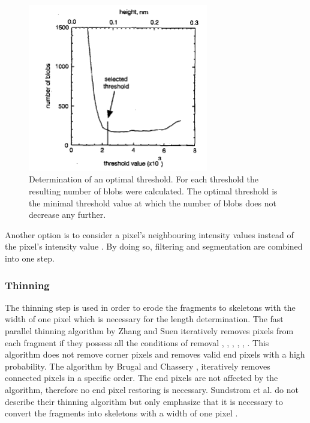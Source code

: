 \documentclass{article}
\begin{document}
\begin{figure}[htb]
\begin{center}
\includegraphics[width = 0.7\textwidth]{Segmentation_histo}
\end{center}
\caption{Determination of an optimal threshold. For each threshold the resulting number of blobs were calculated. The optimal threshold is the minimal threshold value at which the number of blobs does not decrease any further. \cite{russ1992image}}
\label{fig: blobs} %
\end{figure}

Another option is to consider a pixel’s neighbouring intensity values instead of the pixel’s intensity value  \cite{marek2005interactive}. By doing so, filtering and segmentation are combined into one step.


\subsubsection{Thinning}
The thinning step is used in order to erode the fragments to skeletons with the width of one pixel which is necessary for the length determination. The fast parallel thinning algorithm by Zhang and Suen iteratively removes pixels from each fragment if they possess all the conditions of removal  \cite{ficarra2005automated},  \cite{ficarra2002automated},  \cite{ficarra2005automatic},  \cite{spisz1998automated},  \cite{zhang1984fast},  \cite{marturelliautomated}. This algorithm does not remove corner pixels and removes valid end pixels with a high probability. The algorithm by Brugal and Chassery \cite{brugal1977new},  \cite{sanchez2002accuracy} iteratively removes connected pixels in a specific order. The end pixels are not affected by the algorithm, therefore no end pixel restoring is necessary. Sundstrom et al. do not describe their thinning algorithm but only emphasize that it is necessary to convert the fragments into skeletons with a width of one pixel  \cite{sundstrom2012image}.
\end{document}
